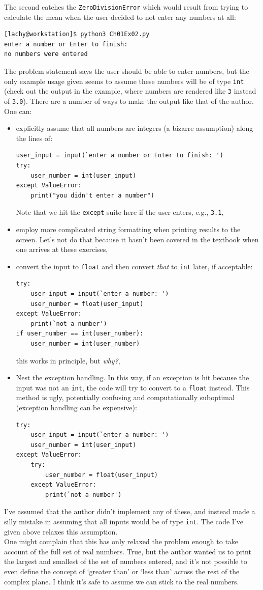 \documentclass{report}
\begin{document}
The second catches the \verb|ZeroDivisionError| which would result from trying to calculate the mean when the user decided to not enter any numbers at all:
\begin{lstlisting}[language=bash, style=terminalStyle]
[lachy@workstation]$ python3 Ch01Ex02.py 
enter a number or Enter to finish: 
no numbers were entered
\end{lstlisting}
\indent The problem statement says the user should be able to enter numbers, but the only example usage given seems to assume these numbers will be of type \verb|int| (check out the output in the example, where numbers are rendered like \verb|3| instead of \verb|3.0|). There are a number of ways to make the output like that of the author. One can:
\begin{itemize}
\item explicitly assume that all numbers are integers (a bizarre assumption) along the lines of:
\begin{verbatim}
user_input = input(`enter a number or Enter to finish: ')
try:
    user_number = int(user_input)
except ValueError:
    print("you didn't enter a number")
\end{verbatim}
Note that we hit the \verb|except| suite here if the user enters, e.g., \verb|3.1|,
\item employ more complicated string formatting when printing results to the screen. Let's not do that because it hasn't been covered in the textbook when one arrives at these exercises,
\item convert the input to \verb|float| and then convert \textit{that} to \verb|int| later, if acceptable:
\begin{verbatim}
try:
    user_input = input(`enter a number: ')
    user_number = float(user_input)
except ValueError:
    print(`not a number')
if user_number == int(user_number):
    user_number = int(user_number)
\end{verbatim}
this works in principle, but \textit{why?},
\item Nest the exception handling. In this way, if an exception is hit because the input was not an \verb|int|, the code will try to convert to a \verb|float| instead. This method is ugly, potentially confusing and computationally suboptimal (exception handling can be expensive):
\begin{verbatim}
try:
    user_input = input(`enter a number: ')
    user_number = int(user_input)
except ValueError:
    try:
        user_number = float(user_input)
    except ValueError:
        print(`not a number')
\end{verbatim}
\end{itemize}
I've assumed that the author didn't implement any of these, and instead made a silly mistake in assuming that all inputs would be of type \verb|int|. The code I've given above relaxes this assumption.\\
\indent One might complain that this has only relaxed the problem enough to take account of the full set of real numbers. True, but the author wanted us to print the largest and smallest of the set of numbers entered, and it's not possible to even define the concept of `greater than' or `less than' across the rest of the complex plane. I think it's safe to assume we can stick to the real numbers.
\newpage
\end{document}
